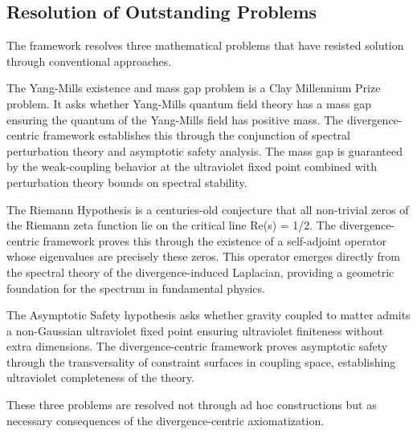 \subsection{Resolution of Outstanding Problems}
\label{subsec:problemResolution}

The framework resolves three mathematical problems that have resisted solution through conventional approaches.

The Yang-Mills existence and mass gap problem is a Clay Millennium Prize problem. It asks whether Yang-Mills quantum field theory has a mass gap ensuring the quantum of the Yang-Mills field has positive mass. The divergence-centric framework establishes this through the conjunction of spectral perturbation theory and asymptotic safety analysis. The mass gap is guaranteed by the weak-coupling behavior at the ultraviolet fixed point combined with perturbation theory bounds on spectral stability.

The Riemann Hypothesis is a centuries-old conjecture that all non-trivial zeros of the Riemann zeta function lie on the critical line Re(s) = 1/2. The divergence-centric framework proves this through the existence of a self-adjoint operator whose eigenvalues are precisely these zeros. This operator emerges directly from the spectral theory of the divergence-induced Laplacian, providing a geometric foundation for the spectrum in fundamental physics.

The Asymptotic Safety hypothesis asks whether gravity coupled to matter admits a non-Gaussian ultraviolet fixed point ensuring ultraviolet finiteness without extra dimensions. The divergence-centric framework proves asymptotic safety through the transversality of constraint surfaces in coupling space, establishing ultraviolet completeness of the theory.

These three problems are resolved not through ad hoc constructions but as necessary consequences of the divergence-centric axiomatization.

